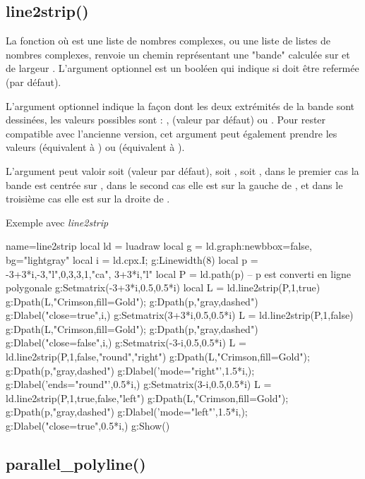 \subsection{line2strip()}

La fonction  où  est une liste de nombres complexes, ou une liste de listes de nombres complexes, renvoie un chemin représentant une "bande" calculée sur  et de largeur . L'argument optionnel  est un booléen qui indique si  doit être refermée (\false par défaut). 

L'argument optionnel  indique la façon dont les deux extrémités de la bande sont dessinées, les valeurs possibles sont : ,  (valeur par défaut) ou . Pour rester compatible avec l'ancienne version, cet argument peut également prendre les valeurs \true (équivalent à ) ou \false (équivalent à ).

L'argument  peut valoir soit  (valeur par défaut), soit , soit , dans le premier cas la bande est centrée sur , dans le second cas elle est sur la gauche de , et dans le troisième cas elle est sur la droite de .

\begin{demo}{Exemple avec \emph{line2strip}}
\begin{luadraw}{name=line2strip}
local ld = luadraw
local g = ld.graph:new{bbox=false, bg="lightgray"}
local i = ld.cpx.I; g:Linewidth(8)
local p = {-3+3*i,-3,"l",0,3,3,1,"ca", 3+3*i,"l"}
local P = ld.path(p) -- p est converti en ligne polygonale
g:Setmatrix({-3+3*i,0.5,0.5*i})
local L = ld.line2strip(P,1,true)
g:Dpath(L,"Crimson,fill=Gold"); g:Dpath(p,"gray,dashed")
g:Dlabel("close=true",i,{})
g:Setmatrix({3+3*i,0.5,0.5*i})
L = ld.line2strip(P,1,false)
g:Dpath(L,"Crimson,fill=Gold"); g:Dpath(p,"gray,dashed")
g:Dlabel("close=false",i,{})
g:Setmatrix({-3-i,0.5,0.5*i})
L = ld.line2strip(P,1,false,"round","right")
g:Dpath(L,"Crimson,fill=Gold"); g:Dpath(p,"gray,dashed")
g:Dlabel('mode="right"',1.5*i,{}); g:Dlabel('ends="round"',0.5*i,{})
g:Setmatrix({3-i,0.5,0.5*i})
L = ld.line2strip(P,1,true,false,"left")
g:Dpath(L,"Crimson,fill=Gold"); g:Dpath(p,"gray,dashed")
g:Dlabel('mode="left"',1.5*i,{}); g:Dlabel("close=true",0.5*i,{})
g:Show()
\end{luadraw}
\end{demo}

\subsection{parallel\_polyline()}

